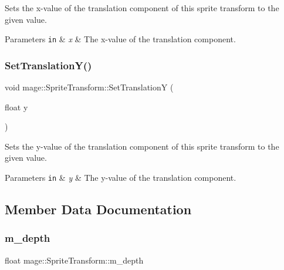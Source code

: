 Sets the x-\/value of the translation component of this sprite transform to the given value.


\begin{DoxyParams}[1]{Parameters}
\mbox{\tt in}  & {\em x} & The x-\/value of the translation component. \\
\hline
\end{DoxyParams}
\hypertarget{structmage_1_1_sprite_transform_a52a07a3c3d9f65a33bc658208cd40444}{}\label{structmage_1_1_sprite_transform_a52a07a3c3d9f65a33bc658208cd40444} 
\subsubsection{\texorpdfstring{Set\+Translation\+Y()}{SetTranslationY()}}
{\footnotesize\ttfamily void mage\+::\+Sprite\+Transform\+::\+Set\+TranslationY (\begin{DoxyParamCaption}\item[{float}]{y }\end{DoxyParamCaption})}

Sets the y-\/value of the translation component of this sprite transform to the given value.


\begin{DoxyParams}[1]{Parameters}
\mbox{\tt in}  & {\em y} & The y-\/value of the translation component. \\
\hline
\end{DoxyParams}


\subsection{Member Data Documentation}
\hypertarget{structmage_1_1_sprite_transform_a9a61159b9f52e5cc18c0f8cea378714c}{}\label{structmage_1_1_sprite_transform_a9a61159b9f52e5cc18c0f8cea378714c} 
\subsubsection{\texorpdfstring{m\+\_\+depth}{m\_depth}}
{\footnotesize\ttfamily float mage\+::\+Sprite\+Transform\+::m\+\_\+depth\hspace{0.3cm}{\ttfamily [private]}}

